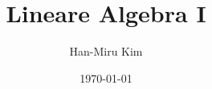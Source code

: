 \documentclass{article}
\title{Lineare Algebra I}
\author{Han-Miru Kim}
\date{\today}
\begin{document}


\normalsize



 

\end{document}
